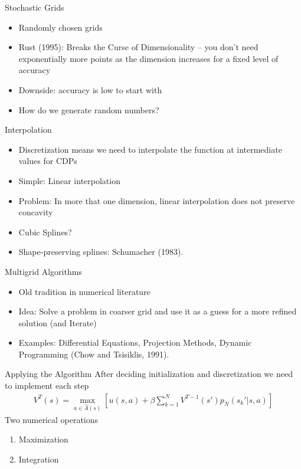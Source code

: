 \documentclass[xcolor=pdftex,dvipsnames,table,mathserif]{beamer}
\begin{document}
\begin{frame}{Stochastic Grids}
\begin{itemize}
\item Randomly chosen grids
\item Rust (1995): Breaks the Curse of Dimensionality -- you don't need exponentially more points as the dimension increases for a fixed level of accuracy
\item Downside: accuracy is low to start with
\item How do we generate random numbers?
\end{itemize}
\end{frame}

\begin{frame}{Interpolation}
\begin{itemize}
\item Discretization means we need to interpolate the function at intermediate values for CDPs
\item Simple: Linear interpolation
\item Problem: In more that one dimension, linear interpolation does not preserve concavity
\item Cubic Splines?
\item Shape-preserving splines: Schumacher (1983).
\end{itemize}
\end{frame}

\begin{frame}{Multigrid Algorithms}
\begin{itemize}
\item Old tradition in numerical literature
\item Idea: Solve a problem in coarser grid and use it as a guess for a more refined solution (and Iterate)
\item Examples: Differential Equations, Projection Methods, Dynamic Programming (Chow and Tsisiklis, 1991).
\end{itemize}
\end{frame}

\begin{frame}{Applying the Algorithm}
After deciding initialization and discretization we need to implement each step
\begin{eqnarray*}
V^T(s) = \max_{a \in \hat{A}(s)} \left[  u(s,a) + \beta \sum_{k=1}^N V^{T-1}(s')p_N (s_k' | s,a) \right]
\end{eqnarray*}
Two numerical operations
\begin{enumerate}
\item Maximization
\item Integration
\end{enumerate}
\end{frame}
\end{document}
